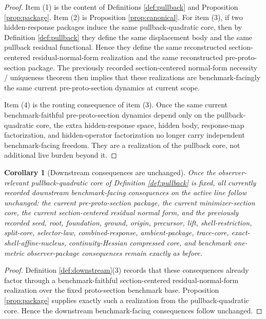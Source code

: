 \documentclass[11pt]{article}
\newtheorem{corollary}{Corollary}
\begin{document}
\begin{proof}
Item (1) is the content of Definitions \ref{def:pullback} and Proposition \ref{prop:package}. Item (2) is Proposition \ref{prop:canonical}. For item (3), if two hidden-response packages induce the same pullback-quadratic core, then by Definition \ref{def:pullback} they define the same displacement body and the same pullback residual functional. Hence they define the same reconstructed section-centered residual-normal-form realization and the same reconstructed pre-proto-section package. The previously recorded section-centered normal-form necessity / uniqueness theorem then implies that these realizations are benchmark-facingly the same current pre-proto-section dynamics at current scope.

Item (4) is the routing consequence of item (3). Once the same current benchmark-faithful pre-proto-section dynamics depend only on the pullback-quadratic core, the extra hidden-response space, hidden body, response-map factorization, and hidden-operator factorization no longer carry independent benchmark-facing freedom. They are a realization of the pullback core, not additional live burden beyond it.
\end{proof}

\begin{corollary}[Downstream consequences are unchanged]
\label{cor:downstream}
Once the observer-relevant pullback-quadratic core of Definition \ref{def:pullback} is fixed, all currently recorded downstream benchmark-facing consequences on the active line follow unchanged: the current pre-proto-section package, the current minimizer-section core, the current section-centered residual normal form, and the previously recorded seed, root, foundation, ground, origin, precursor, lift, shell-restriction, split-core, selector-law, combined-response, ambient-package, trace-core, exact-shell-affine-nucleus, continuity-Hessian compressed core, and benchmark one-metric observer-package consequences remain exactly as before.
\end{corollary}

\begin{proof}
Definition \ref{def:downstream}(3) records that these consequences already factor through a benchmark-faithful section-centered residual-normal-form realization over the fixed proto-section benchmark base. Proposition \ref{prop:package} supplies exactly such a realization from the pullback-quadratic core. Hence the downstream benchmark-facing consequences follow unchanged.
\end{proof}
\end{document}

